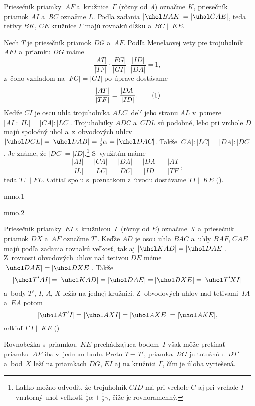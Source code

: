 {%
Priesečník priamky~$AF$ a~kružnice~$\Gamma$  (rôzny od $A$) označme $K$, priesečník priamok $AI$ a~$BC$ označme $L$. Podľa zadania $|\uhol BAK|=|\uhol CAE|$, teda tetivy $BK$, $CE$ kružnice $\Gamma$ majú rovnakú dĺžku a~$BC\parallel KE$.

Nech $T$ je priesečník priamok $DG$ a~$AF$. Podľa Menelaovej vety pre trojuholník $AFI$ a~priamku $DG$ máme
$$
\frac{|AT|}{|TF|}\cdot\frac{|FG|}{|GI|}\cdot\frac{|ID|}{|DA|}=1,
$$
z~čoho vzhľadom na $|FG|=|GI|$ po úprave dostávame
$$
\frac{|AT|}{|TF|}=\frac{|DA|}{|ID|}.
\tag1
$$
Keďže $CI$ je osou uhla trojuholníka $ALC$, delí jeho stranu $AL$ v~pomere $|AI|:|IL|=|CA|:|LC|$. Trojuholníky $ADC$ a~$CDL$ sú podobné, lebo pri vrchole $D$ majú spoločný uhol a~z~obvodových uhlov $|\uhol DCL|=|\uhol DAB|=\frac12\alpha=|\uhol DAC|$. Takže $|CA|:|LC|=|DA|:|DC|$. Je známe, že $|DC|=|ID|$.\footnote{Ľahko možno odvodiť, že trojuholník $CID$ má pri vrchole $C$ aj pri vrchole $I$ vnútorný uhol veľkosti $\frac12\alpha+\frac12\gamma$, čiže je rovnoramenný.} S~využitím  máme
$$
\frac{|AI|}{|IL|}=\frac{|CA|}{|LC|}=\frac{|DA|}{|DC|}=\frac{|DA|}{|ID|}=\frac{|AT|}{|TF|},
$$
teda $TI\parallel FL$. Odtiaľ spolu s~poznatkom z~úvodu dostávame $TI\parallel KE$ (\obr).

\epsplace mmo.1 \hfil\Obr\par
\epsplace mmo.2 \hfil\Obr\par
\twocpictures


Priesečník priamky~$EI$ s~kružnicou~$\Gamma$ (rôzny od $E$) označme $X$ a~priesečník priamok $DX$ a~$AF$ označme $T'$. Keďže $AD$ je osou uhla $BAC$ a~uhly $BAF$, $CAE$ majú podľa zadania rovnakú veľkosť, tak aj $|\uhol KAD|=|\uhol DAE|$. Z~rovnosti obvodových uhlov nad tetivou $DE$ máme $|\uhol DAE|=|\uhol DXE|$. Takže
$$
|\uhol T'AI|=|\uhol KAD|=|\uhol DAE|=|\uhol DXE|=|\uhol T'XI|
$$
a~body $T'$, $I$, $A$, $X$ ležia na jednej kružnici. Z~obvodových uhlov nad tetivami~$IA$ a~$EA$ potom
$$
|\uhol AT'I|=|\uhol AXI|=|\uhol AXE|=|\uhol AKE|,
$$
odkiaľ $T'I\parallel KE$ (\obr).

Rovnobežka s~priamkou~$KE$ prechádzajúca bodom~$I$ však môže pretínať priam\-ku~$AF$ iba v~jednom bode. Preto $T=T'$, priamka~$DG$ je totožná s~$DT'$ a~bod~$X$ leží na priamkach $DG$, $EI$ aj na kružnici $\Gamma$, čím je úloha vyriešená.
}

